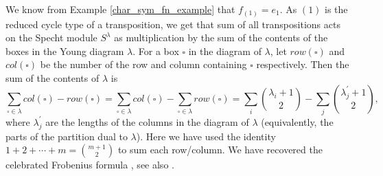 \documentclass[ALCO,Unicode]{cedram}
\begin{document}
\begin{example}
We know from Example \ref{char_sym_fn_example} that $f_{(1)} = e_1$. As $(1)$ is the reduced cycle type of a transposition, we get that sum of all transpositions acts on the Specht module $S^\lambda$ as multiplication by the sum of the contents of the boxes in the Young diagram $\lambda$. For a box $\square$ in the diagram of $\lambda$, let $row(\square)$ and $col(\square)$ be the number of the row and column containing $\square$ respectively. Then the sum of the contents of $\lambda$ is
\[
\sum_{\square \in \lambda} col(\square) - row(\square) = \sum_{\square \in \lambda} col(\square) - \sum_{\square \in \lambda} row(\square) = \sum_i \binom{\lambda_i +1}{2} - \sum_{j} \binom{\lambda_j^\prime +1}{2},
\]
where $\lambda_j^\prime$ are the lengths of the columns in the diagram of $\lambda$ (equivalently, the parts of the partition dual to $\lambda$). Here we have used the identity $1 + 2 + \cdots + m = \binom{m +1}{2}$ to sum each row/column. We have recovered the celebrated Frobenius formula \cite{Frobenius}, see also \cite[Example 7, Section 1.7]{Macdonald}. 
\end{example}
\end{document}
